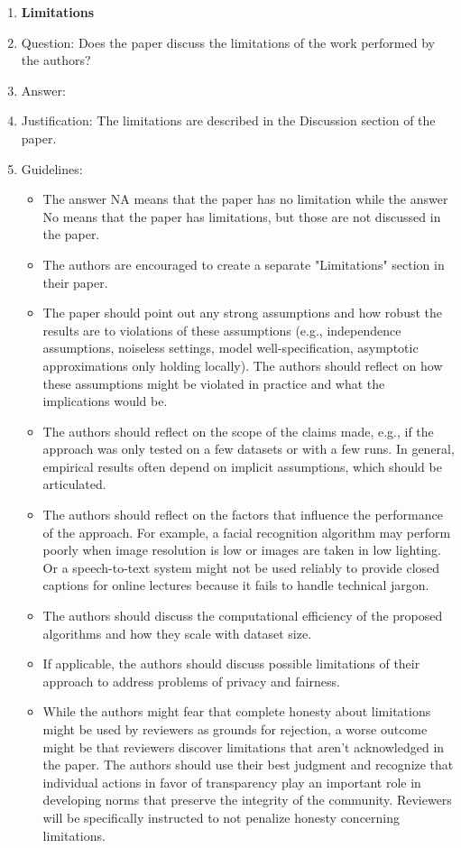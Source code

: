 \documentclass{article}
\theoremstyle{definition} \newtheorem{definition}{Definition}  \newtheorem{example}{Example}
\theoremstyle{remark} \newtheorem{remark}{Remark}
\newcounter{ct}
\begin{document}
\begin{enumerate}
\item {\bf Limitations}
    \item[] Question: Does the paper discuss the limitations of the work performed by the authors?
    \item[] Answer: \answerYes{} %
    \item[] Justification: The limitations are described in the Discussion section of the paper.
    \item[] Guidelines:
    \begin{itemize}
        \item The answer NA means that the paper has no limitation while the answer No means that the paper has limitations, but those are not discussed in the paper. 
        \item The authors are encouraged to create a separate "Limitations" section in their paper.
        \item The paper should point out any strong assumptions and how robust the results are to violations of these assumptions (e.g., independence assumptions, noiseless settings, model well-specification, asymptotic approximations only holding locally). The authors should reflect on how these assumptions might be violated in practice and what the implications would be.
        \item The authors should reflect on the scope of the claims made, e.g., if the approach was only tested on a few datasets or with a few runs. In general, empirical results often depend on implicit assumptions, which should be articulated.
        \item The authors should reflect on the factors that influence the performance of the approach. For example, a facial recognition algorithm may perform poorly when image resolution is low or images are taken in low lighting. Or a speech-to-text system might not be used reliably to provide closed captions for online lectures because it fails to handle technical jargon.
        \item The authors should discuss the computational efficiency of the proposed algorithms and how they scale with dataset size.
        \item If applicable, the authors should discuss possible limitations of their approach to address problems of privacy and fairness.
        \item While the authors might fear that complete honesty about limitations might be used by reviewers as grounds for rejection, a worse outcome might be that reviewers discover limitations that aren't acknowledged in the paper. The authors should use their best judgment and recognize that individual actions in favor of transparency play an important role in developing norms that preserve the integrity of the community. Reviewers will be specifically instructed to not penalize honesty concerning limitations.
    \end{itemize}


\end{enumerate}
\end{document}
